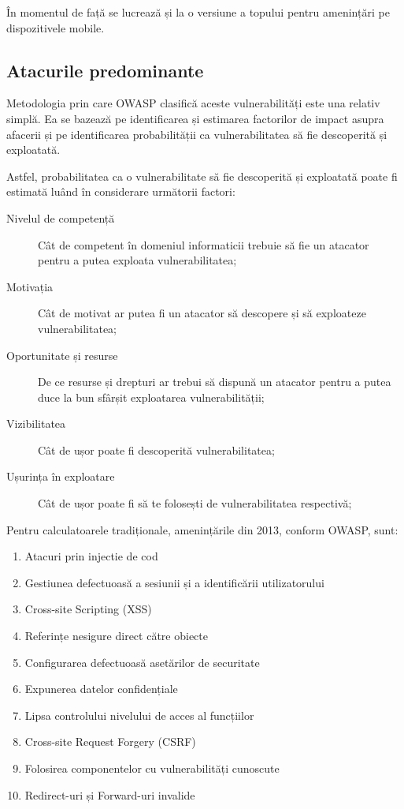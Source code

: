 \documentclass[12pt,a4paper,draft]{article}
\begin{document}
		În momentul de față se lucrează și la o versiune a topului pentru amenințări pe dispozitivele mobile.
		
		\subsection{Atacurile predominante}
		Metodologia prin care OWASP clasifică aceste vulnerabilități este una relativ simplă. Ea se bazează pe identificarea și estimarea factorilor de impact asupra afacerii și pe identificarea probabilității ca vulnerabilitatea să fie descoperită și exploatată.

		Astfel, probabilitatea ca o vulnerabilitate să fie descoperită și exploatată poate fi estimată luând în considerare următorii factori:
		\begin{description}
			\item[Nivelul de competență] Cât de competent în domeniul informaticii trebuie să fie un atacator pentru a putea exploata vulnerabilitatea;
			\item[Motivația] Cât de motivat ar putea fi un atacator să descopere și să exploateze vulnerabilitatea;
			\item[Oportunitate și resurse] De ce resurse și drepturi ar trebui să dispună un atacator pentru a putea duce la bun sfârșit exploatarea vulnerabilității;
			\item[Vizibilitatea] Cât de ușor poate fi descoperită vulnerabilitatea;
			\item[Ușurința în exploatare] Cât de ușor poate fi să te folosești de vulnerabilitatea respectivă;
			\item[]
		\end{description}

		Pentru calculatoarele tradiționale, amenințările din 2013, conform OWASP, sunt:
		\begin{enumerate}
			\item Atacuri prin injectie de cod
			\item Gestiunea defectuoasă a sesiunii și a identificării utilizatorului
			\item Cross-site Scripting (XSS)
			\item Referințe nesigure direct către obiecte
			\item Configurarea defectuoasă asetărilor de securitate
			\item Expunerea datelor confidențiale
			\item Lipsa controlului nivelului de acces al funcțiilor
			\item Cross-site Request Forgery (CSRF)
			\item Folosirea componentelor cu vulnerabilități cunoscute
			\item Redirect-uri și Forward-uri invalide
		\end{enumerate}
\end{document}
